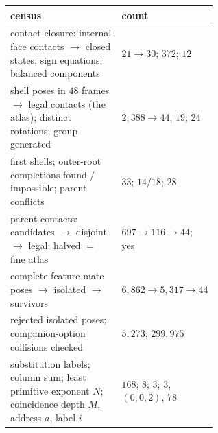 \begin{tabular}{L{0.6\linewidth} l}
\toprule
census & count \\
\midrule
contact closure: internal face contacts $\to$ closed states; sign equations; balanced components & $21\to30$; $372$; $12$ \\
shell poses in $48$ frames $\to$ legal contacts (the atlas); distinct rotations; group generated & $2{,}388\to44$; $19$; $24$ \\
first shells; outer-root completions found / impossible; parent conflicts & $33$; $14/18$; $28$ \\
parent contacts: candidates $\to$ disjoint $\to$ legal; halved $=$ fine atlas & $697\to116\to44$; yes \\
complete-feature mate poses $\to$ isolated $\to$ survivors & $6{,}862\to5{,}317\to44$ \\
rejected isolated poses; companion-option collisions checked & $5{,}273$; $299{,}975$ \\
substitution labels; column sum; least primitive exponent $N$; coincidence depth $M$, address $a$, label $i$ & $168$; $8$; $3$; $3$, $(0,0,2)$, $78$ \\
\bottomrule
\end{tabular}
